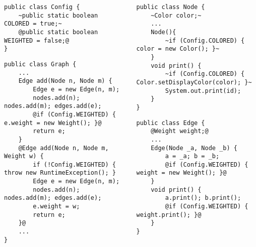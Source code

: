 \begin{frame}[fragile]{\myframetitle}
		\begin{columns}
\begin{tiny}
\begin{lstlisting}
public class Config {
	~public static boolean COLORED = true;~
	@public static boolean WEIGHTED = false;@
}
\end{lstlisting}
\begin{lstlisting}
public class Graph {
	...
	Edge add(Node n, Node m) {
		Edge e = new Edge(n, m);
		nodes.add(n); nodes.add(m); edges.add(e);
		@if (Config.WEIGHTED) { e.weight = new Weight(); }@
		return e;
	}
	@Edge add(Node n, Node m, Weight w) {
		if (!Config.WEIGHTED) { throw new RuntimeException(); }
		Edge e = new Edge(n, m);
		nodes.add(n); nodes.add(m); edges.add(e);
		e.weight = w;
		return e;
	}@
	...
}
\end{lstlisting}
\end{tiny}	
\begin{tiny}
\begin{lstlisting}
public class Node {
	~Color color;~
	...
	Node(){
		~if (Config.COLORED) { color = new Color(); }~
	}
	void print() {
		~if (Config.COLORED) { Color.setDisplayColor(color); }~
		System.out.print(id);
	}
}
\end{lstlisting}
\begin{lstlisting}
public class Edge {
	@Weight weight;@
	...
	Edge(Node _a, Node _b) {
		a = _a; b = _b;
		@if (Config.WEIGHTED) { weight = new Weight(); }@
	}
	void print() {
		a.print(); b.print();
		@if (Config.WEIGHTED) { weight.print(); }@
	}
}
\end{lstlisting}
\end{tiny}	
		\end{columns}
\end{frame}

